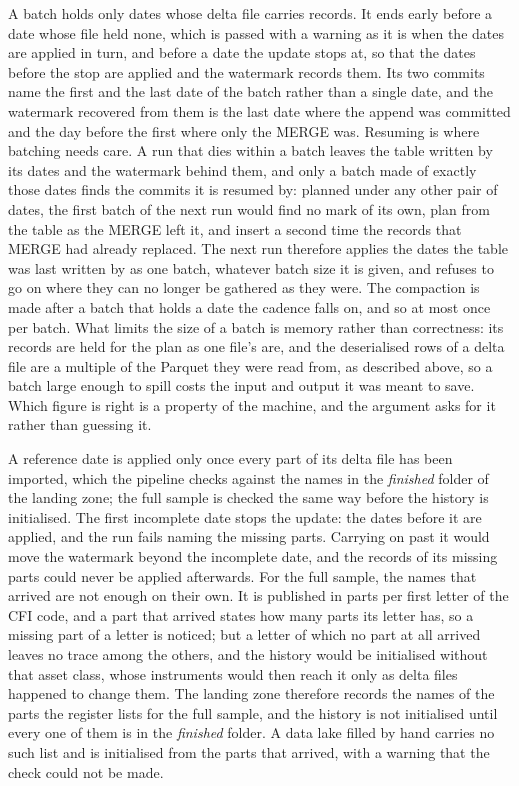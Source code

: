 A batch holds only dates whose delta file carries records. It ends early before a date whose file held none, which is passed with a warning as it is when the dates are applied in turn, and before a date the update stops at, so that the dates before the stop are applied and the watermark records them. Its two commits name the first and the last date of the batch rather than a single date, and the watermark recovered from them is the last date where the append was committed and the day before the first where only the MERGE was. Resuming is where batching needs care. A run that dies within a batch leaves the table written by its dates and the watermark behind them, and only a batch made of exactly those dates finds the commits it is resumed by: planned under any other pair of dates, the first batch of the next run would find no mark of its own, plan from the table as the MERGE left it, and insert a second time the records that MERGE had already replaced. The next run therefore applies the dates the table was last written by as one batch, whatever batch size it is given, and refuses to go on where they can no longer be gathered as they were. The compaction is made after a batch that holds a date the cadence falls on, and so at most once per batch. What limits the size of a batch is memory rather than correctness: its records are held for the plan as one file's are, and the deserialised rows of a delta file are a multiple of the Parquet they were read from, as described above, so a batch large enough to spill costs the input and output it was meant to save. Which figure is right is a property of the machine, and the argument asks for it rather than guessing it.

A reference date is applied only once every part of its delta file has been imported, which the pipeline checks against the names in the \emph{finished} folder of the landing zone; the full sample is checked the same way before the history is initialised. The first incomplete date stops the update: the dates before it are applied, and the run fails naming the missing parts. Carrying on past it would move the watermark beyond the incomplete date, and the records of its missing parts could never be applied afterwards. For the full sample, the names that arrived are not enough on their own. It is published in parts per first letter of the CFI code, and a part that arrived states how many parts its letter has, so a missing part of a letter is noticed; but a letter of which no part at all arrived leaves no trace among the others, and the history would be initialised without that asset class, whose instruments would then reach it only as delta files happened to change them. The landing zone therefore records the names of the parts the register lists for the full sample, and the history is not initialised until every one of them is in the \emph{finished} folder. A data lake filled by hand carries no such list and is initialised from the parts that arrived, with a warning that the check could not be made.

